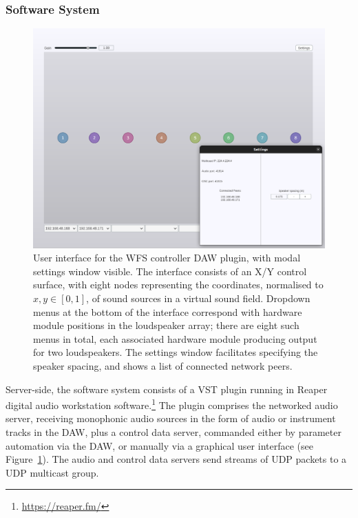 \documentclass[utf8]{FrontiersinHarvard}
\newcommand{\figref}[1]{Figure~\ref{#1}}
\begin{document}
    \subsubsection{Software System}\label{subsubsec:software-system}

    \begin{figure}[ht]
        \centering
        \includegraphics[width=\textwidth]{figures/plugin}
        \caption{
            User interface for the WFS controller DAW plugin, with modal
            settings window visible.
            The interface consists of an X/Y control surface, with eight nodes
            representing the coordinates, normalised to $x,y \in [0,1]$, of sound
            sources in a virtual sound field.
            Dropdown menus at the bottom of the interface correspond with hardware
            module positions in the loudspeaker array; there are eight such menus
            in total, each associated hardware module producing output for two
            loudspeakers.
            The settings window facilitates specifying the speaker spacing, and
            shows a list of connected network peers.
        }
        \label{fig:plugin-interface}
    \end{figure}

    Server-side, the software system consists of a VST plugin running in Reaper
    digital audio workstation software.\footnote{\url{https://reaper.fm/}}
    The plugin comprises the networked audio server, receiving monophonic audio
    sources in the form of audio or instrument tracks in the DAW, plus a control
    data server, commanded either by parameter automation via the DAW, or manually
    via a graphical user interface (see \figref{fig:plugin-interface}).
    The audio and control data servers send streams of UDP packets to a UDP
    multicast group.
\end{document}
